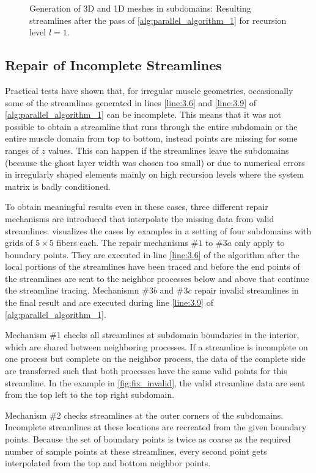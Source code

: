 \begin{figure}
  \caption{Generation of 3D and 1D meshes in subdomains: Resulting streamlines after the pass of \cref{alg:parallel_algorithm_1} for recursion level $l=1$.}%
  \label{fig:improved}%
\end{figure}%

\subsection{Repair of Incomplete Streamlines}\label{sec:repair_of_incomplete_streamlines}

Practical tests have shown that, for irregular muscle geometries, occasionally some of the streamlines generated in lines \ref{line:3.6} and \ref{line:3.9} of \cref{alg:parallel_algorithm_1} can be incomplete. This means that it was not possible to obtain a streamline that runs through the entire subdomain or the entire muscle domain from top to bottom, instead points are missing for some ranges of $z$ values. This can happen if the streamlines leave the subdomains (because the ghost layer width was chosen too small) or due to numerical errors in irregularly shaped elements mainly on high recursion levels where the system matrix is badly conditioned.

To obtain meaningful results even in these cases, three different repair mechanisms are introduced that interpolate the missing data from valid streamlines.  visualizes the cases by examples in a setting of four subdomains with grids of $5 \times 5$ fibers each. The repair mechanisms $\#1$ to $\#3a$ only apply to boundary points. They are executed in line \ref{line:3.6} of the algorithm after the local portions of the streamlines have been traced and before the end points of the streamlines are sent to the neighbor processes below and above that continue the streamline tracing. Mechanismn $\#3b$ and $\#3c$ repair invalid streamlines in the final result and are executed during line \ref{line:3.9} of \cref{alg:parallel_algorithm_1}.

Mechanism \#1 checks all streamlines at subdomain boundaries in the interior, which are shared between neighboring processes. If a streamline is incomplete on one process but complete on the neighbor process, the data of the complete side are transferred such that both processes have the same valid points for this streamline. In the example in \cref{fig:fix_invalid}, the valid streamline data are sent from the top left to the top right subdomain.

Mechanism \#2 checks streamlines at the outer corners of the subdomains. Incomplete streamlines at these locations are recreated from the given boundary points. Because the set of boundary points is twice as coarse as the required number of sample points at these streamlines, every second point gets interpolated from the top and bottom neighbor points.

